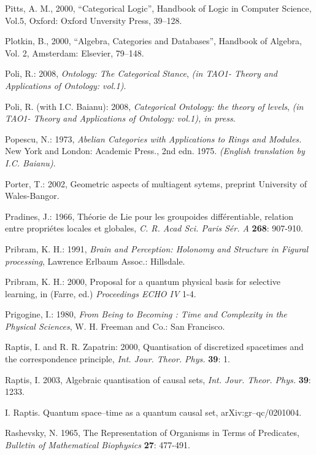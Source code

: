 \documentclass[12pt]{article}
\begin{document}
\begin{thebibliography}{399}
Pitts, A. M., 2000, ``Categorical Logic'', Handbook of Logic in Computer Science, Vol.5, Oxford: Oxford Unversity Press, 39--128.

Plotkin, B., 2000, ``Algebra, Categories and Databases'', Handbook of Algebra, Vol. 2, Amsterdam: Elsevier, 79--148. 

Poli, R.: 2008, \emph{Ontology: The Categorical Stance}, \emph{(in TAO1- Theory and Applications of Ontology: vol.1)}.

Poli, R. (with I.C. Baianu): 2008, \emph{Categorical Ontology: the theory of levels}, \emph{(in TAO1- Theory and Applications of Ontology: vol.1), in press}.


Popescu, N.: 1973, \emph{Abelian Categories with Applications to Rings and Modules.} New York and London: Academic Press., 2nd edn. 1975. \emph{(English translation by I.C. Baianu)}.

Porter, T.: 2002, Geometric aspects of multiagent sytems, preprint University of Wales-Bangor.

Pradines, J.: 1966, Th\'eorie de Lie pour les groupoides
diff\'erentiable, relation entre propri\'etes locales et globales,
\emph{C. R. Acad Sci. Paris S\'er. A} \textbf{268}: 907-910.

Pribram, K. H.: 1991, \emph{Brain and Perception: Holonomy and Structure in Figural processing}, Lawrence Erlbaum Assoc.: Hillsdale.

Pribram, K. H.: 2000, Proposal for a quantum physical basis for selective learning, in (Farre, ed.) \emph{Proceedings ECHO IV} 1-4.

Prigogine, I.: 1980, \emph{From Being to Becoming : Time and Complexity in the Physical Sciences}, W. H. Freeman and Co.:  San Francisco.

Raptis, I. and R. R. Zapatrin: 2000, Quantisation of discretized spacetimes and the correspondence principle, \emph{Int. Jour. Theor. Phys.} \textbf{39}: 1.

Raptis, I. 2003, Algebraic quantisation of causal sets, \emph{Int. Jour. Theor. Phys.} \textbf{39}: 1233.

I. Raptis. Quantum space--time as a quantum causal set, arXiv:gr--qc/0201004.

Rashevsky, N. 1965, The Representation of Organisms in Terms of Predicates, \emph{Bulletin of Mathematical Biophysics} \textbf{27}: 477-491.


\end{thebibliography}
\end{document}
